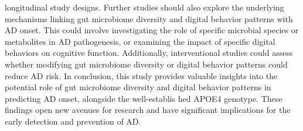 \documentclass[conference]{IEEEtran}
\begin{document}
longitudinal study designs. Further studies should also explore the underlying mechanisms linking gut microbiome diversity and digital behavior patterns with AD onset. This could involve investigating the role of specific microbial species or metabolites in AD pathogenesis, or examining the impact of specific digital behaviors on cognitive function. Additionally, interventional studies could assess whether modifying gut microbiome diversity or digital behavior patterns could reduce AD risk. In conclusion, this study provides valuable insights into the potential role of gut microbiome diversity and digital behavior patterns in predicting AD onset, alongside the well-establis hed APOE4 genotype. These findings open new avenues for research and have significant implications for the early detection and prevention of AD.
\end{document}
